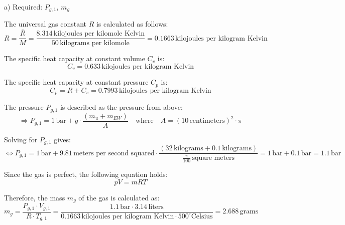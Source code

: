 a) Required: \(P_{g,1}\), \(m_g\)

The universal gas constant \(R\) is calculated as follows:
\[ R = \frac{\bar{R}}{M} = \frac{8.314 \, \text{kilojoules per kilomole Kelvin}}{50 \, \text{kilograms per kilomole}} = 0.1663 \, \text{kilojoules per kilogram Kelvin} \]

The specific heat capacity at constant volume \(C_v\) is:
\[ C_v = 0.633 \, \text{kilojoules per kilogram Kelvin} \]

The specific heat capacity at constant pressure \(C_p\) is:
\[ C_p = R + C_v = 0.7993 \, \text{kilojoules per kilogram Kelvin} \]

The pressure \(P_{g,1}\) is described as the pressure from above:
\[ \Rightarrow P_{g,1} = 1 \, \text{bar} + g \cdot \frac{(m_u + m_{EW})}{A} \quad \text{where} \quad A = (10 \, \text{centimeters})^2 \cdot \pi \]

Solving for \(P_{g,1}\) gives:
\[ \Leftrightarrow P_{g,1} = 1 \, \text{bar} + 9.81 \, \text{meters per second squared} \cdot \frac{(32 \, \text{kilograms} + 0.1 \, \text{kilograms})}{\frac{\pi}{100} \, \text{square meters}} = 1 \, \text{bar} + 0.1 \, \text{bar} = 1.1 \, \text{bar} \]

Since the gas is perfect, the following equation holds:
\[ pV = mRT \]

Therefore, the mass \(m_g\) of the gas is calculated as:
\[ m_g = \frac{P_{g,1} \cdot V_{g,1}}{R \cdot T_{g,1}} = \frac{1.1 \, \text{bar} \cdot 3.14 \, \text{liters}}{0.1663 \, \text{kilojoules per kilogram Kelvin} \cdot 500^\circ \text{Celsius}} = 2.688 \, \text{grams} \]